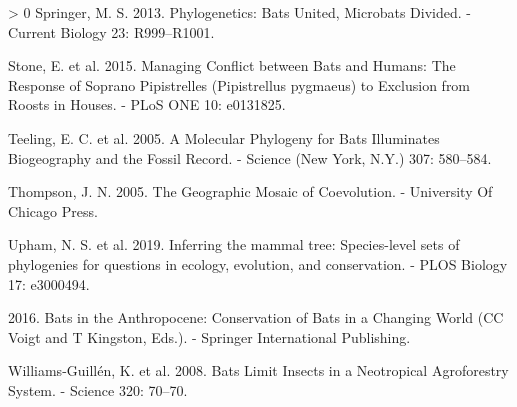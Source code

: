 \documentclass[10pt,oneside]{article}
\newlength{\cslhangindent}
\newenvironment{CSLReferences}[3] %
 {%
  \setlength{\parindent}{0pt}
  \ifodd #1 \everypar{\setlength{\hangindent}{\cslhangindent}}\ignorespaces\fi
  \ifnum #2 > 0
  \setlength{\parskip}{#2\baselineskip}
  \fi
 }%
 {}
\begin{document}
\begin{CSLReferences}{1}{0}
\leavevmode\hypertarget{ref-Springer2013PhyBat}{}%
Springer, M. S. 2013. Phylogenetics: Bats United, Microbats Divided. -
Current Biology 23: R999--R1001.

\leavevmode\hypertarget{ref-Stone2015ManCon}{}%
Stone, E. et al. 2015. Managing Conflict between Bats and Humans: The
Response of Soprano Pipistrelles (Pipistrellus pygmaeus) to Exclusion
from Roosts in Houses. - PLoS ONE 10: e0131825.

\leavevmode\hypertarget{ref-Teeling2005MolPhy}{}%
Teeling, E. C. et al. 2005. A Molecular Phylogeny for Bats Illuminates
Biogeography and the Fossil Record. - Science (New York, N.Y.) 307:
580--584.

\leavevmode\hypertarget{ref-Thompson2005GeoMos}{}%
Thompson, J. N. 2005. The Geographic Mosaic of Coevolution. - University
Of Chicago Press.

\leavevmode\hypertarget{ref-Upham2019InfMam}{}%
Upham, N. S. et al. 2019. Inferring the mammal tree: Species-level sets
of phylogenies for questions in ecology, evolution, and conservation. -
PLOS Biology 17: e3000494.

\leavevmode\hypertarget{ref-Voigt2016BatAnt}{}%
2016. Bats in the Anthropocene: Conservation of Bats in a Changing World
(CC Voigt and T Kingston, Eds.). - Springer International Publishing.

\leavevmode\hypertarget{ref-Williams-Guillen2008BatLim}{}%
Williams-Guillén, K. et al. 2008. Bats Limit Insects in a Neotropical
Agroforestry System. - Science 320: 70--70.

\end{CSLReferences}
\end{document}
